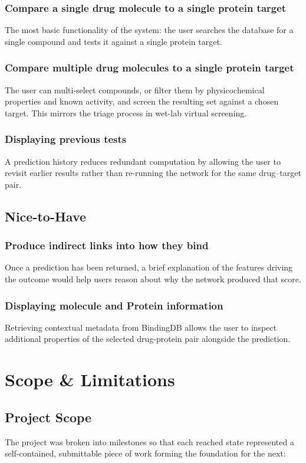 \subsubsection{Compare a single drug molecule to a single protein target}
The most basic functionality of the system: the user searches the database for a single compound and tests it against a single protein target.
\subsubsection{Compare multiple drug molecules to a single protein target}
The user can multi-select compounds, or filter them by physicochemical properties and known activity, and screen the resulting set against a chosen target.
This mirrors the triage process in wet-lab virtual screening.
\subsubsection{Displaying previous tests}
A prediction history reduces redundant computation by allowing the user to revisit earlier results rather than re-running the network for the same drug--target pair.
\subsection{Nice-to-Have}
\subsubsection{Produce indirect links into how they bind}
Once a prediction has been returned, a brief explanation of the features driving the outcome would help users reason about why the network produced that score.
\subsubsection{Displaying molecule and Protein information}
Retrieving contextual metadata from BindingDB allows the user to inspect additional properties of the selected drug-protein pair alongside the prediction.

\section{Scope \& Limitations}
\subsection{Project Scope}
The project was broken into milestones so that each reached state represented a self-contained, submittable piece of work forming the foundation for the next:
